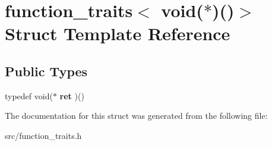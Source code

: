 \hypertarget{structfunction__traits_3_01void_07_5_08_07_08_4}{\section{function\-\_\-traits$<$ void($\ast$)()$>$ Struct Template Reference}
\label{structfunction__traits_3_01void_07_5_08_07_08_4}
}
\subsection*{Public Types}
\begin{DoxyCompactItemize}
\item 
\hypertarget{structfunction__traits_3_01void_07_5_08_07_08_4_aa806a8bd3227e3e9eb99d9d818d2a3e8}{typedef void($\ast$ {\bfseries ret} )()}\label{structfunction__traits_3_01void_07_5_08_07_08_4_aa806a8bd3227e3e9eb99d9d818d2a3e8}

\end{DoxyCompactItemize}


The documentation for this struct was generated from the following file\-:\begin{DoxyCompactItemize}
\item 
src/function\-\_\-traits.\-h\end{DoxyCompactItemize}
